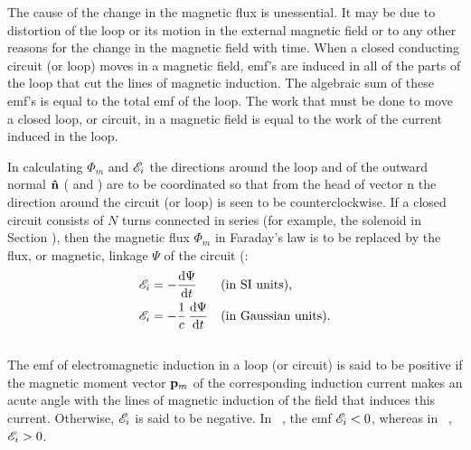 
The cause of the change in the magnetic flux is unessential. It may be due to distortion of the loop or its motion in the external magnetic field or to any other reasons for the change in the magnetic field with time. When a closed conducting circuit (or loop) moves in a magnetic field, emf's are induced in all of the parts of the loop that cut the lines of magnetic induction. The algebraic sum of these emf's  is equal to the total emf of the loop. The work that must be done to move a closed loop, or circuit, in a magnetic field is equal to the work of the current induced in the loop.

In calculating $\Phi_{m}$ and $\mathscr{E}_{i}$ the directions around the loop  and of the outward normal $\vu{n}$ ( and ) are to be coordinated so that from the head of vector n the direction around the circuit (or loop) is seen to be counterclockwise. If a closed circuit consists of $N$ turns connected in series (for example, the solenoid in Section ), then the magnetic flux $\Phi_{m}$ in Faraday's law is to be replaced by the flux, or magnetic, linkage $\Psi$ of the circuit (:
\begin{align*}%
\emf_{i} & = - \dv{\Psi}{t} &&  \text{(in SI units),} \\
\emf_{i} & = - \frac{1}{c}\,\dv{\Psi}{t} &&  \text{(in Gaussian units)}.
\end{align*}

\subsection{}\label{25.1.3} The emf of electromagnetic induction in a loop (or circuit) is said to be positive if the magnetic moment vector $\vb{p}_{m}$ of the corresponding induction current  makes an acute angle with the lines of magnetic induction of the field that induces this current. Otherwise, $\mathscr{E}_{i}$ is said to be negative. In ~, the emf $\mathscr{E}_{i} < 0$, whereas in ~, $\mathscr{E}_{i} > 0$. 


